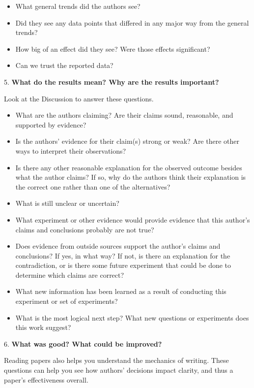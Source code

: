 \documentclass[
]{book}
\providecommand{\tightlist}{%
  \setlength{\itemsep}{0pt}\setlength{\parskip}{0pt}}
\begin{document}
\begin{itemize}
\tightlist
\item
  What general trends did the authors see?
\item
  Did they see any data points that differed in any major way from the general trends?
\item
  How big of an effect did they see? Were those effects significant?
\item
  Can we trust the reported data?
\end{itemize}

5. \textbf{What do the results mean? Why are the results important?}

Look at the Discussion to answer these questions.

\begin{itemize}
\tightlist
\item
  What are the authors claiming? Are their claims sound, reasonable, and supported by evidence?
\item
  Is the authors' evidence for their claim(s) strong or weak? Are there other ways to interpret their observations?
\item
  Is there any other reasonable explanation for the observed outcome besides what the author claims? If so, why do the authors think their explanation is the correct one rather than one of the alternatives?
\item
  What is still unclear or uncertain?
\item
  What experiment or other evidence would provide evidence that this author's claims and conclusions probably are not true?
\item
  Does evidence from outside sources support the author's claims and conclusions? If yes, in what way? If not, is there an explanation for the contradiction, or is there some future experiment that could be done to determine which claims are correct?
\item
  What new information has been learned as a result of conducting this experiment or set of experiments?
\item
  What is the most logical next step? What new questions or experiments does this work suggest?
\end{itemize}

6. \textbf{What was good? What could be improved?}

Reading papers also helps you understand the mechanics of writing. These questions can help you see how authors' decisions impact clarity, and thus a paper's effectiveness overall.
\end{document}
